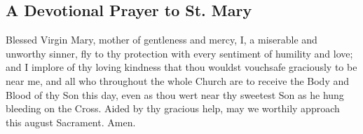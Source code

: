 
\subsection{A Devotional Prayer to St. Mary}
 Blessed Virgin Mary, mother of gentleness and mercy, I, a miserable and unworthy sinner, fly to thy protection with every sentiment of humility and love; and I implore of thy loving kindness that thou wouldst vouchsafe graciously to be near me, and all who throughout the whole Church are to receive the Body and Blood of thy Son this day, even as thou wert near thy sweetest Son as he hung bleeding on the Cross. Aided by thy gracious help, may we worthily approach this august Sacrament. Amen.

